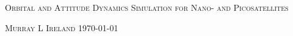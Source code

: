 \begin{titlepage}
	\begin{center}
		\vskip2cm
		\fontsize{0.8cm}{1cm}\selectfont
		\textsc{Orbital and Attitude Dynamics Simulation for Nano- and Picosatellites}\par\vskip2cm
		\Large \textsc{Murray L Ireland}
		\vskip1cm
		\today
		\vskip1cm
	\end{center}
\end{titlepage}
\restoregeometry